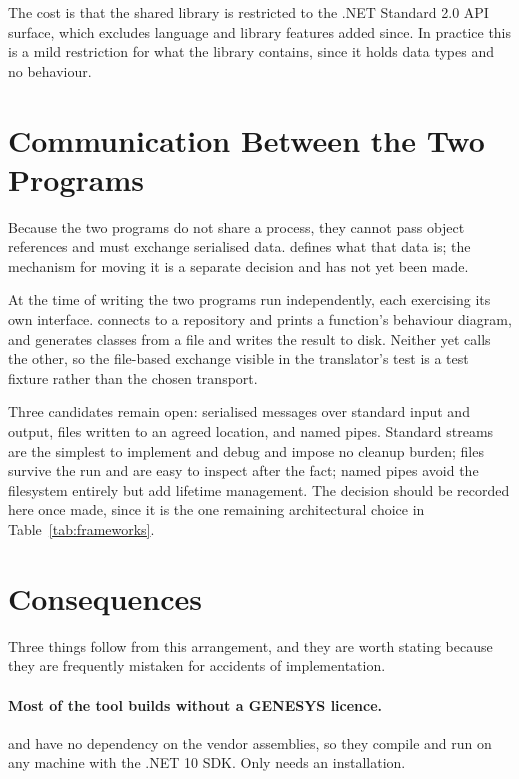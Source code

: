 The cost is that the shared library is restricted to the .NET Standard 2.0 API
surface, which excludes language and library features added since. In practice
this is a mild restriction for what the library contains, since it holds data
types and no behaviour.

\section{Communication Between the Two Programs}

Because the two programs do not share a process, they cannot pass object
references and must exchange serialised data.  defines
what that data is; the mechanism for moving it is a separate decision and has not
yet been made.

At the time of writing the two programs run independently, each exercising its
own interface.  connects to a repository and prints a
function's behaviour diagram, and  generates classes
from a  file and writes the result to disk. Neither yet calls
the other, so the file-based exchange visible in the translator's test is a test
fixture rather than the chosen transport.

Three candidates remain open: serialised messages over standard input and output,
files written to an agreed location, and named pipes. Standard streams are the
simplest to implement and debug and impose no cleanup burden; files survive the
run and are easy to inspect after the fact; named pipes avoid the filesystem
entirely but add lifetime management. The decision should be recorded here once
made, since it is the one remaining architectural choice in
Table~\ref{tab:frameworks}.

\section{Consequences}

Three things follow from this arrangement, and they are worth stating because
they are frequently mistaken for accidents of implementation.

\paragraph{Most of the tool builds without a GENESYS licence.}
 and  have no dependency on
the vendor assemblies, so they compile and run on any machine with the .NET 10
SDK. Only  needs an installation.

